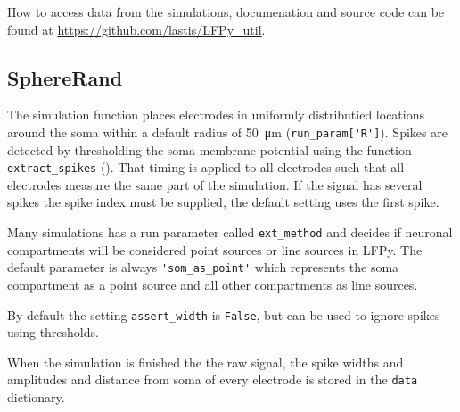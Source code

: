 \documentclass[altfont, fleqn]{uiophd}
\renewcommand{\cref}[1]{{\color{viridis_03}\mycref{#1}}}
\begin{document}
\begin{appendices}
How to access data from the simulations, 
documenation
and source code can be found at
\url{https://github.com/lastis/LFPy_util}. 
\newline

\subsection{SphereRand}
\label{sec:sphererand}
The simulation function places
electrodes in uniformly distributied locations 
around the soma within a default radius of \SI{50}{\micro\metre}
(\verb+run_param['R']+). 
Spikes are detected by thresholding the soma membrane potential
using the function
\verb+extract_spikes+ 
(\cref{sec:frequent_functions}).
That timing is applied to all electrodes such that all electrodes measure
the same part of the simulation. 
If the signal has several spikes
the spike index must be supplied, the default setting uses the first spike.

Many simulations has a run parameter called
\verb+ext_method+ and decides
if neuronal compartments will be considered point sources
or line sources in LFPy. 
The default parameter is always 
\verb+'som_as_point'+ 
which represents the soma compartment as a point source and
all other compartments as line sources. 

By default the setting 
\verb+assert_width+ is 
\verb+False+, 
but can be used to ignore spikes using thresholds. 

When the simulation is finished the
the raw signal, the spike widths and amplitudes and distance from
soma of every electrode is stored in the \verb+data+ dictionary. 
\newline

\end{appendices}
\end{document}
